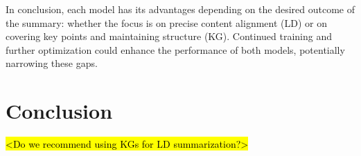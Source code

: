 \documentclass[12pt]{article}
\begin{document}
In conclusion, each model has its advantages depending on the desired outcome of the summary: whether the focus is on precise content alignment (LD) or on covering key points and maintaining structure (KG). Continued training and further optimization could enhance the performance of both models, potentially narrowing these gaps.


\section{Conclusion}
\hl{<Do we recommend using KGs for LD summarization?>}


\newpage
\printbibliography
\end{document}

